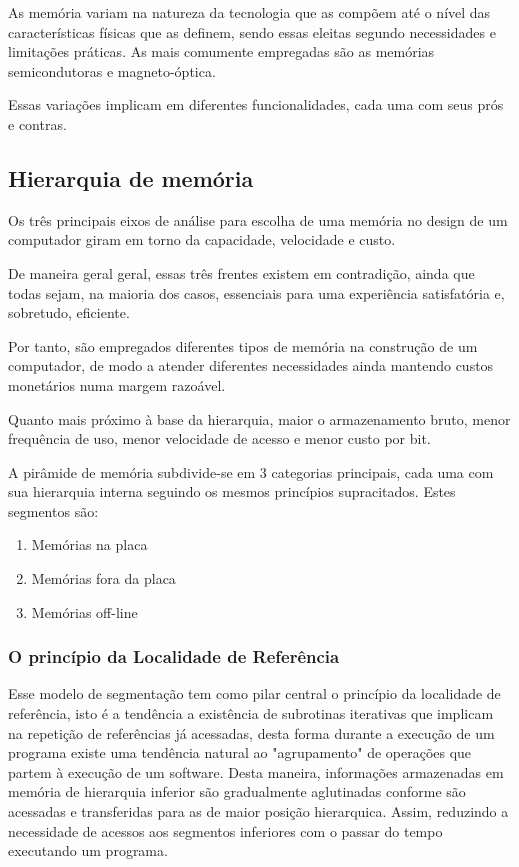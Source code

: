 \documentclass[12pt]{article}
\begin{document}
As memória variam na natureza da tecnologia que as compõem até o nível das características físicas que as definem, sendo essas eleitas segundo necessidades e limitações práticas. As mais comumente empregadas são as memórias semicondutoras e magneto-óptica.

Essas variações implicam em diferentes funcionalidades, cada uma com seus prós e contras.

\subsection{Hierarquia de memória}
Os três principais eixos de análise para escolha de uma memória no design de um computador giram em torno da capacidade, velocidade e custo.

De maneira geral geral, essas três frentes existem em contradição, ainda que todas sejam, na maioria dos casos, essenciais para uma experiência satisfatória e, sobretudo, eficiente.

Por tanto, são empregados diferentes tipos de memória na construção de um computador, de modo a atender diferentes necessidades ainda mantendo custos monetários numa margem razoável. 

Quanto mais próximo à base da hierarquia, maior o armazenamento bruto, menor frequência de uso, menor velocidade de acesso e menor custo por bit.

A pirâmide de memória subdivide-se em 3 categorias principais, cada uma com sua hierarquia interna seguindo os mesmos princípios supracitados. Estes segmentos são:
\begin{enumerate}
    \item Memórias na placa
    \item Memórias fora da placa
    \item Memórias off-line
\end{enumerate}

\subsubsection*{O princípio da Localidade de Referência}
Esse modelo de segmentação tem como pilar central o princípio da localidade de referência, isto é a tendência a existência de subrotinas iterativas que implicam na repetição de referências já acessadas, desta forma durante a execução de um programa existe uma tendência natural ao "agrupamento" de operações que partem à execução de um software. Desta maneira, informações armazenadas em memória de hierarquia inferior são gradualmente aglutinadas conforme são acessadas e transferidas para as de maior posição hierarquica. Assim, reduzindo a necessidade de acessos aos segmentos inferiores com o passar do tempo executando um programa.
\end{document}
